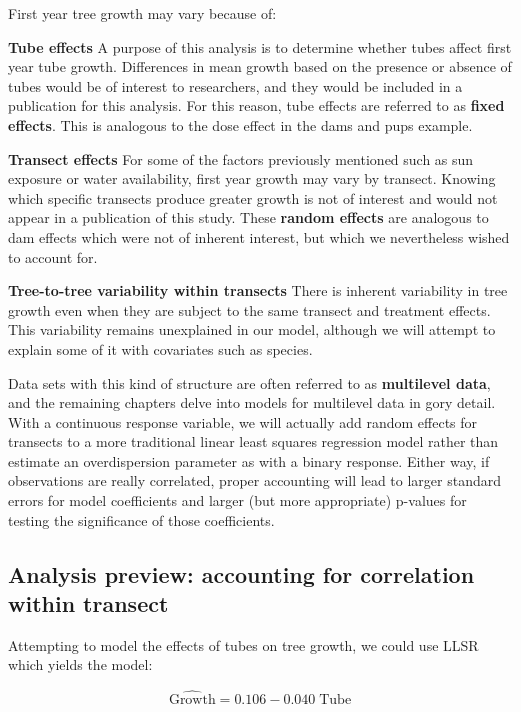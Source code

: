 \documentclass[
]{krantz}
\begin{document}
First year tree growth may vary because of:

\textbf{Tube effects} A purpose of this analysis is to determine whether tubes affect first year tube growth. Differences in mean growth based on the presence or absence of tubes would be of interest to researchers, and they would be included in a publication for this analysis. For this reason, tube effects are referred to as \textbf{fixed effects}. This is analogous to the dose effect in the dams and pups example.

\textbf{Transect effects} For some of the factors previously mentioned such as sun exposure or water availability, first year growth may vary by transect. Knowing which specific transects produce greater growth is not of interest and would not appear in a publication of this study. These \textbf{random effects} are analogous to dam effects which were not of inherent interest, but which we nevertheless wished to account for.

\textbf{Tree-to-tree variability within transects} There is inherent variability in tree growth even when they are subject to the same transect and treatment effects. This variability remains unexplained in our model, although we will attempt to explain some of it with covariates such as species.

Data sets with this kind of structure are often referred to as \textbf{multilevel data},  and the remaining chapters delve into models for multilevel data in gory detail. With a continuous response variable, we will actually add random effects for transects to a more traditional linear least squares regression model rather than estimate an overdispersion parameter as with a binary response. Either way, if observations are really correlated, proper accounting will lead to larger standard errors for model coefficients and larger (but more appropriate) p-values for testing the significance of those coefficients.

\hypertarget{analysis-preview-accounting-for-correlation-within-transect}{%
\subsection{Analysis preview: accounting for correlation within transect}\label{analysis-preview-accounting-for-correlation-within-transect}}

Attempting to model the effects of tubes on tree growth, we could use LLSR which yields the model:

\begin{equation*}
  \hat{\textrm{Growth}} = 0.106 - 0.040\; \textrm{Tube}
\end{equation*}
\end{document}
